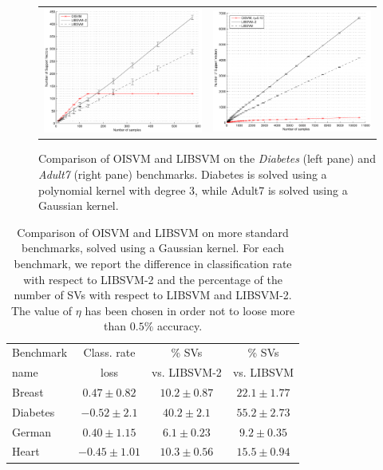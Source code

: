 \begin{figure}[!ht]
  \centering \footnotesize
  \begin{tabular}{cc}
  \includegraphics[width=0.47\linewidth]{figs/results/finite_kernel.pdf} &
  \includegraphics[width=0.47\linewidth]{figs/results/adult7.pdf}
  \end{tabular}
  \caption{Comparison of OISVM and LIBSVM on the \emph{Diabetes}
  (left pane) and \emph{Adult7} (right pane) benchmarks. Diabetes is
  solved using a polynomial kernel with degree $3$, while Adult7 is
  solved using a Gaussian kernel.}
\label{fig:ad7}
\end{figure}

\begin{table}
\begin{center}
\begin{tabular}[!h]{|l|c|c|c|}
\hline
  Benchmark & Class. rate    & \% SVs          & \% SVs        \\
       name & loss           & vs. LIBSVM-2    & vs. LIBSVM    \\ \hline
     Breast & $0.47\pm0.82$  & $10.2\pm0.87$   & $22.1\pm1.77$ \\
   Diabetes & $-0.52\pm2.1$  & $40.2\pm2.1$    & $55.2\pm2.73$ \\
   German   & $0.40\pm1.15$  & $6.1\pm0.23$    & $9.2\pm0.35$  \\
   Heart    & $-0.45\pm1.01$ & $10.3\pm0.56$   & $15.5\pm0.94$ \\ \hline
\end{tabular}
\end{center}
\label{table:t1}
\caption{Comparison of OISVM and LIBSVM on more standard benchmarks, solved
 using a Gaussian kernel. For each benchmark, we report the difference
 in classification rate with respect to LIBSVM-2 and the
 percentage of the number of SVs with respect to LIBSVM and
 LIBSVM-2. The value of $\eta$ has been chosen in order not to loose
 more than $0.5\%$ accuracy.}
\end{table}


